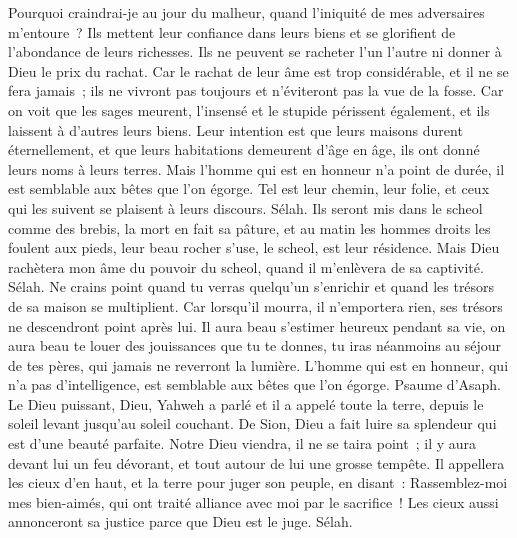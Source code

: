 \begin{multicols}{2}
Pourquoi craindrai-je au jour du malheur, quand l'iniquité de mes adversaires m'entoure~?
Ils mettent leur confiance dans leurs biens et se glorifient de l'abondance de leurs richesses.
Ils ne peuvent se racheter l'un l'autre ni donner à Dieu le prix du rachat.
Car le rachat de leur âme est trop considérable, et il ne se fera jamais~;
ils ne vivront pas toujours et n'éviteront pas la vue de la fosse.
Car on voit que les sages meurent, l'insensé et le stupide périssent également, et ils laissent à d'autres leurs biens.
Leur intention est que leurs maisons durent éternellement, et que leurs habitations demeurent d'âge en âge, ils ont donné leurs noms à leurs terres.
Mais l'homme qui est en honneur n'a point de durée, il est semblable aux bêtes que l'on égorge.
Tel est leur chemin, leur folie, et ceux qui les suivent se plaisent à leurs discours. Sélah.
Ils seront mis dans le scheol comme des brebis, la mort en fait sa pâture, et au matin les hommes droits les foulent aux pieds, leur beau rocher s'use, le scheol, est leur résidence.
Mais Dieu rachètera mon âme du pouvoir du scheol, quand il m'enlèvera de sa captivité. Sélah.
Ne crains point quand tu verras quelqu'un s'enrichir et quand les trésors de sa maison se multiplient.
Car lorsqu'il mourra, il n'emportera rien, ses trésors ne descendront point après lui.
Il aura beau s'estimer heureux pendant sa vie, on aura beau te louer des jouissances que tu te donnes,
tu iras néanmoins au séjour de tes pères, qui jamais ne reverront la lumière.
L'homme qui est en honneur, qui n'a pas d'intelligence, est semblable aux bêtes que l'on égorge.
\VerseOne{}Psaume d'Asaph. Le Dieu puissant, Dieu, Yahweh a parlé et il a appelé toute la terre, depuis le soleil levant jusqu'au soleil couchant.
De Sion, Dieu a fait luire sa splendeur qui est d'une beauté parfaite.
Notre Dieu viendra, il ne se taira point~; il y aura devant lui un feu dévorant, et tout autour de lui une grosse tempête.
Il appellera les cieux d'en haut, et la terre pour juger son peuple, en disant~:
Rassemblez-moi mes bien-aimés, qui ont traité alliance avec moi par le sacrifice~!
Les cieux aussi annonceront sa justice parce que Dieu est le juge. Sélah.

\end{multicols}
